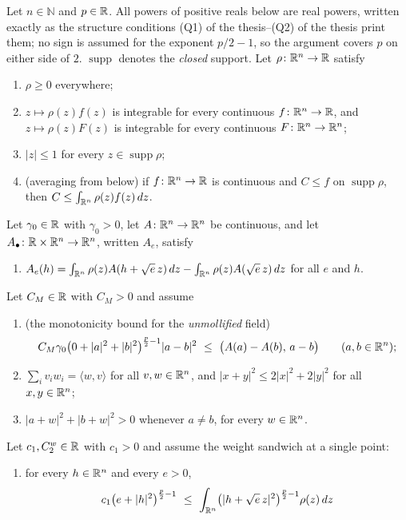 \begin{helper}
Let $n\in\mathbb{N}$ and $p\in\mathbb{R}$.  All powers of positive reals below are real
powers, written exactly as the structure conditions
(Q1) of the thesis--(Q2) of the thesis print them; no sign is assumed for the exponent
$p/2-1$, so the argument covers $p$ on either side of $2$.
$\operatorname{supp}$ denotes the \emph{closed} support.  Let
$\rho\colon\mathbb{R}^n\to\mathbb{R}$ satisfy
\begin{enumerate}
\item[(H1)] $\rho\ge0$ everywhere;
\item[(H2)] $z\mapsto\rho(z)f(z)$ is integrable for every continuous
  $f\colon\mathbb{R}^n\to\mathbb{R}$, and $z\mapsto\rho(z)F(z)$ is integrable for every
  continuous $F\colon\mathbb{R}^n\to\mathbb{R}^n$;
\item[(H3)] $|z|\le1$ for every $z\in\operatorname{supp}\rho$;
\item[(H4)] (averaging from below) if $f\colon\mathbb{R}^n\to\mathbb{R}$ is continuous and
  $C\le f$ on $\operatorname{supp}\rho$, then
  $C\le\int_{\mathbb{R}^n}\rho(z)f(z)\,dz$.
\end{enumerate}
Let $\gamma_0\in\mathbb{R}$ with $\gamma_0>0$, let $A\colon\mathbb{R}^n\to\mathbb{R}^n$ be continuous,
and let $A_\bullet\colon\mathbb{R}\times\mathbb{R}^n\to\mathbb{R}^n$, written $A_e$, satisfy
\begin{enumerate}
\item[(H5)] $A_e(h)=\int_{\mathbb{R}^n}\rho(z)A(h+\sqrt e\,z)\,dz
  -\int_{\mathbb{R}^n}\rho(z)A(\sqrt e\,z)\,dz$ for all $e$ and $h$.
\end{enumerate}
Let $C_M\in\mathbb{R}$ with $C_M>0$ and assume
\begin{enumerate}
\item[(H6)] (the monotonicity bound for the \emph{unmollified} field)
  \[
  C_M\gamma_0\bigl(0+|a|^2+|b|^2\bigr)^{\frac p2-1}|a-b|^2
  \ \le\ \bigl(A(a)-A(b),\,a-b\bigr)
  \qquad(a,b\in\mathbb{R}^n);
  \]
\item[(H7)] $\sum_iv_iw_i=\langle w,v\rangle$ for all $v,w\in\mathbb{R}^n$, and
  $|x+y|^2\le2|x|^2+2|y|^2$ for all $x,y\in\mathbb{R}^n$;
\item[(H8)] $|a+w|^2+|b+w|^2>0$ whenever $a\ne b$, for every $w\in\mathbb{R}^n$.
\end{enumerate}
Let $c_1,C_2^{w}\in\mathbb{R}$ with $c_1>0$ and assume the weight sandwich at a single
point:
\begin{enumerate}
\item[(H9)] for every $h\in\mathbb{R}^n$ and every $e>0$,
  \[
  c_1\bigl(e+|h|^2\bigr)^{\frac p2-1}
  \ \le\ \int_{\mathbb{R}^n}\bigl(|h+\sqrt e\,z|^2\bigr)^{\frac p2-1}\rho(z)\,dz
\]
\end{enumerate}
\end{helper}
